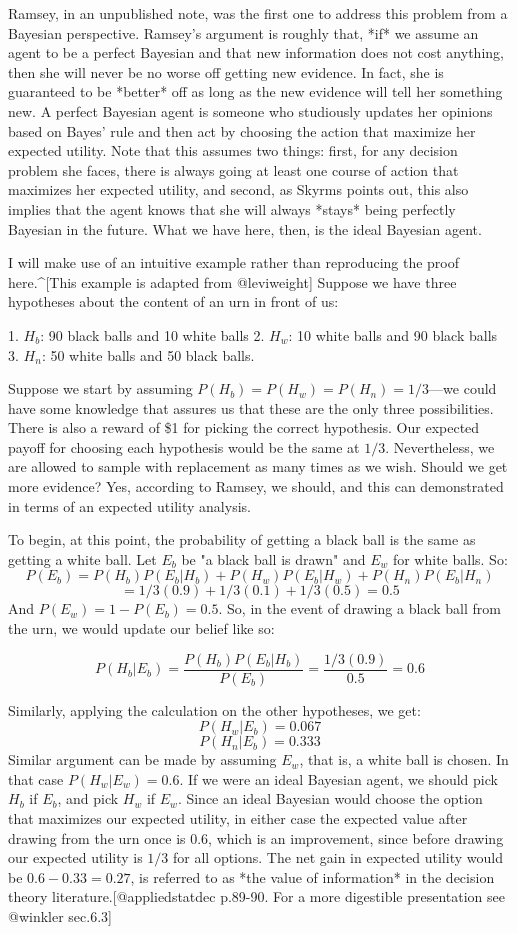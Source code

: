 Ramsey, in an unpublished note, was the first one to address this
problem from a Bayesian perspective. Ramsey's argument is roughly that,
*if* we assume an agent to be a perfect Bayesian and that new
information does not cost anything, then she will never be no worse off
getting new evidence. In fact, she is guaranteed to be *better* off as
long as the new evidence will tell her something new. A perfect Bayesian
agent is someone who studiously updates her opinions based on Bayes'
rule and then act by choosing the action that maximize her expected
utility. Note that this assumes two things: first, for any decision
problem she faces, there is always going at least one course of action
that maximizes her expected utility, and second, as Skyrms points out,
this also implies that the agent knows that she will always *stays*
being perfectly Bayesian in the future. What we have here, then, is the
ideal Bayesian agent.

I will make use of an intuitive example rather than reproducing the
proof here.\^{}{[}This example is adapted from @leviweight{]} Suppose we
have three hypotheses about the content of an urn in front of us:

1. \(H_b\): 90 black balls and 10 white balls 2. \(H_w\): 10 white balls
and 90 black balls 3. \(H_n\): 50 white balls and 50 black balls.

Suppose we start by assuming \(P(H_b) = P(H_w) = P(H_n) = 1/3\)---we
could have some knowledge that assures us that these are the only three
possibilities. There is also a reward of \$1 for picking the correct
hypothesis. Our expected payoff for choosing each hypothesis would be
the same at \(1/3\). Nevertheless, we are allowed to sample with
replacement as many times as we wish. Should we get more evidence? Yes,
according to Ramsey, we should, and this can demonstrated in terms of an
expected utility analysis.

To begin, at this point, the probability of getting a black ball is the
same as getting a white ball. Let \(E_b\) be "a black ball is drawn" and
\(E_w\) for white balls. So:
\[P(E_b) = P(H_b)P(E_b|H_b) + P(H_w)P(E_b|H_w) + P(H_n)P(E_b|H_n)\]
\[=1/3(0.9)+1/3(0.1)+1/3(0.5)=0.5\] And \(P(E_w) = 1 - P(E_b) = 0.5\).
So, in the event of drawing a black ball from the urn, we would update
our belief like so:

\[P(H_b|E_b) = \frac{P(H_b)P(E_b|H_b)}{P(E_b)}=\frac{1/3(0.9)}{0.5} = 0.6\]

Similarly, applying the calculation on the other hypotheses, we get:
\[P(H_w|E_b) = 0.067\] \[P(H_n|E_b) = 0.333\] Similar argument can be
made by assuming \(E_w\), that is, a white ball is chosen. In that case
\(P(H_w|E_w) = 0.6\). If we were an ideal Bayesian agent, we should pick
\(H_b\) if \(E_b\), and pick \(H_w\) if \(E_w\). Since an ideal Bayesian
would choose the option that maximizes our expected utility, in either
case the expected value after drawing from the urn once is \(0.6\),
which is an improvement, since before drawing our expected utility is
\(1/3\) for all options. The net gain in expected utility would be
\(0.6 - 0.33 = 0.27\), is referred to as *the value of information* in
the decision theory literature.{[}@appliedstatdec p.89-90. For a more
digestible presentation see @winkler sec.6.3{]}


